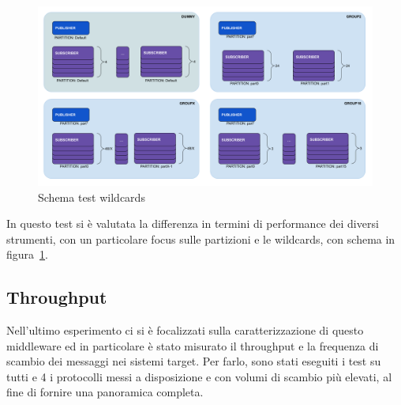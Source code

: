 \begin{figure}[H]
    \includegraphics[width=\textwidth]{./img/wildcards.png}
    \caption{Schema test wildcards}\label{fig:test_UML_wildcards}
\end{figure} 

In questo test si è valutata la differenza in termini di performance dei diversi strumenti, con un particolare focus sulle partizioni e le wildcards, con schema in figura~\ref{fig:test_UML_wildcards}.

\subsection{Throughput}
Nell'ultimo esperimento ci si è focalizzati sulla caratterizzazione di questo middleware ed in particolare è stato misurato il throughput e la frequenza di scambio dei messaggi nei sistemi target. 
Per farlo, sono stati eseguiti i test su tutti e 4 i protocolli messi a disposizione e con volumi di scambio più elevati, al fine di fornire una panoramica completa. %

    
